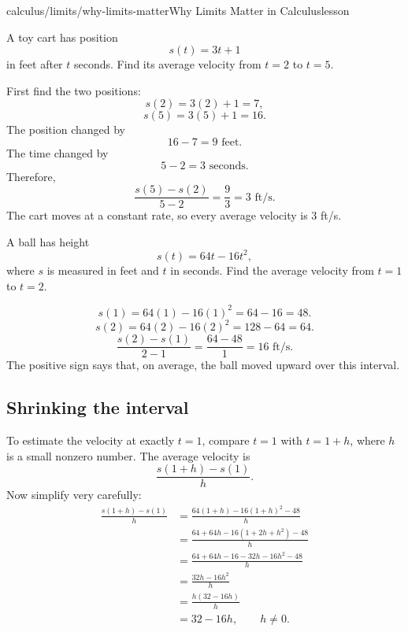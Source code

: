 \begin{webpage}{calculus/limits/why-limits-matter}{Why Limits Matter in Calculus}{lesson}
\begin{bgguided}[title={A straight-moving cart}]
A toy cart has position
\[
  s(t)=3t+1
\]
in feet after \(t\) seconds. Find its average velocity from \(t=2\) to \(t=5\).

\begin{bgsolution}
First find the two positions:
\[
  s(2)=3(2)+1=7,
\]
\[
  s(5)=3(5)+1=16.
\]
The position changed by
\[
  16-7=9\text{ feet}.
\]
The time changed by
\[
  5-2=3\text{ seconds}.
\]
Therefore,
\[
  \frac{s(5)-s(2)}{5-2}
  =\frac{9}{3}
  =\boxed{3\text{ ft/s}}.
\]
The cart moves at a constant rate, so every average velocity is \(3\) ft/s.
\end{bgsolution}
\end{bgguided}

\begin{bgexample}[title={A ball thrown upward}]
A ball has height
\[
  s(t)=64t-16t^2,
\]
where \(s\) is measured in feet and \(t\) in seconds. Find the average velocity from \(t=1\) to \(t=2\).

\begin{bgsolution}
\[
  s(1)=64(1)-16(1)^2=64-16=48.
\]
\[
  s(2)=64(2)-16(2)^2=128-64=64.
\]
\[
  \frac{s(2)-s(1)}{2-1}
  =\frac{64-48}{1}
  =\boxed{16\text{ ft/s}}.
\]
The positive sign says that, on average, the ball moved upward over this interval.
\end{bgsolution}
\end{bgexample}

\subsection{Shrinking the interval}

To estimate the velocity at exactly \(t=1\), compare \(t=1\) with \(t=1+h\), where \(h\) is a small nonzero number. The average velocity is
\[
  \frac{s(1+h)-s(1)}{h}.
\]
Now simplify very carefully:
\begin{align*}
\frac{s(1+h)-s(1)}{h}
&=\frac{64(1+h)-16(1+h)^2-48}{h}\\
&=\frac{64+64h-16(1+2h+h^2)-48}{h}\\
&=\frac{64+64h-16-32h-16h^2-48}{h}\\
&=\frac{32h-16h^2}{h}\\
&=\frac{h(32-16h)}{h}\\
&=32-16h,\qquad h\ne0.
\end{align*}


\end{webpage}
